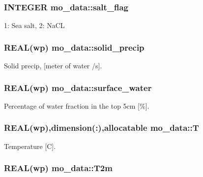 \hypertarget{namespacemo__data_a0fb41b8dc5463c7215d278a301f17509}{
\subsubsection[{salt\_\-flag}]{\setlength{\rightskip}{0pt plus 5cm}INTEGER {\bf mo\_\-data::salt\_\-flag}}}
\label{namespacemo__data_a0fb41b8dc5463c7215d278a301f17509}


1: Sea salt, 2: NaCL 

\hypertarget{namespacemo__data_a4dee26c05c4bcb3d685c7a24ba41bf63}{
\subsubsection[{solid\_\-precip}]{\setlength{\rightskip}{0pt plus 5cm}REAL(wp) {\bf mo\_\-data::solid\_\-precip}}}
\label{namespacemo__data_a4dee26c05c4bcb3d685c7a24ba41bf63}


Solid precip, \mbox{[}meter of water /s\mbox{]}. 

\hypertarget{namespacemo__data_a330cc0e4bc178ef722ccd333c69aa06d}{
\subsubsection[{surface\_\-water}]{\setlength{\rightskip}{0pt plus 5cm}REAL(wp) {\bf mo\_\-data::surface\_\-water}}}
\label{namespacemo__data_a330cc0e4bc178ef722ccd333c69aa06d}


Percentage of water fraction in the top 5cm \mbox{[}\%\mbox{]}. 

\hypertarget{namespacemo__data_a0969de41af73c828aa2ff388011081ba}{
\subsubsection[{T}]{\setlength{\rightskip}{0pt plus 5cm}REAL(wp),dimension(:),allocatable {\bf mo\_\-data::T}}}
\label{namespacemo__data_a0969de41af73c828aa2ff388011081ba}


Temperature \mbox{[}C\mbox{]}. 

\hypertarget{namespacemo__data_a987a45ea7aa457299f91119864d0baff}{
\subsubsection[{T2m}]{\setlength{\rightskip}{0pt plus 5cm}REAL(wp) {\bf mo\_\-data::T2m}}}
\label{namespacemo__data_a987a45ea7aa457299f91119864d0baff}


